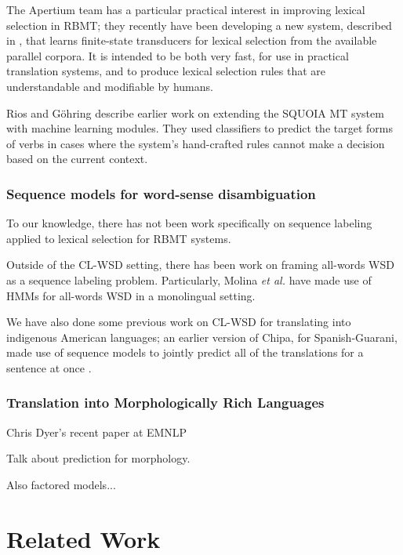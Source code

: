 The Apertium team has a particular practical interest in improving lexical
selection in RBMT; they recently have been developing
a new system, described in \cite{tyers-fst}, that learns finite-state
transducers for lexical selection from the available parallel corpora. It is
intended to be both very fast, for use in practical translation systems, and
to produce lexical selection rules that are understandable and modifiable by
humans.

Rios and G\"{o}hring \cite{riosgonzales-gohring:2013:HyTra} describe
earlier work on extending the SQUOIA MT system with machine learning modules.
They used classifiers to predict the target forms of verbs in cases where the
system's hand-crafted rules cannot make a decision based on the current
context.

\subsection{Sequence models for word-sense disambiguation}
To our knowledge, there has not been work specifically on sequence labeling
applied to lexical selection for RBMT systems.

Outside of the CL-WSD setting, there has been work on framing all-words WSD as
a sequence labeling problem. Particularly, Molina \textit{et al.}
\cite{DBLP:conf/iberamia/MolinaPS02} have made use of HMMs for all-words
WSD in a monolingual setting.

We have also done some previous work on CL-WSD for translating into indigenous
American languages; an earlier version of Chipa, for Spanish-Guarani, made use
of sequence models to jointly predict all of the translations for a sentence at
once \cite{rudnick-gasser:2013:HyTra}.



\subsection{Translation into Morphologically Rich Languages}
Chris Dyer's recent paper at EMNLP
\cite{chahuneau:2013:emnlp}

Talk about prediction for morphology.
\cite{toutanova-suzuki-ruopp:2008:ACLMain}

Also factored models...
\cite{yeniterzi-oflazer:2010:ACL}


\chapter{Related Work}
\label{sec:relatedwork}

